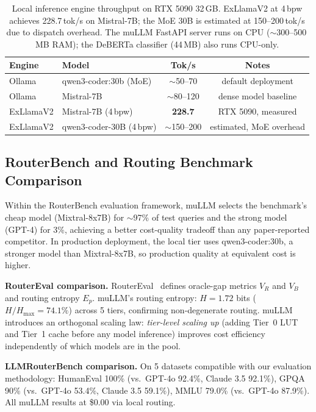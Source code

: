 \documentclass[11pt]{article}
\begin{document}
\begin{table}[t]
\centering
\small
\begin{tabular}{llcc}
\toprule
\textbf{Engine} & \textbf{Model} & \textbf{Tok/s} & \textbf{Notes} \\
\midrule
Ollama & qwen3-coder:30b (MoE) & $\sim$50--70 & default deployment \\
Ollama & Mistral-7B & $\sim$80--120 & dense model baseline \\
ExLlamaV2 & Mistral-7B (4\,bpw) & \textbf{228.7} & RTX 5090, measured \\
ExLlamaV2 & qwen3-coder-30B (4\,bpw) & $\sim$150--200 & estimated, MoE overhead \\
\bottomrule
\end{tabular}
\caption{Local inference engine throughput on RTX 5090 32\,GB.
ExLlamaV2 at 4\,bpw achieves 228.7\,tok/s on Mistral-7B; the MoE 30B
is estimated at 150--200\,tok/s due to dispatch overhead. The
muLLM FastAPI server runs on CPU ($\sim$300--500\,MB RAM); the
DeBERTa classifier (44\,MB) also runs CPU-only.}
\label{tab:engines}
\end{table}

\subsection{RouterBench and Routing Benchmark Comparison}

Within the RouterBench evaluation framework, muLLM selects the benchmark's
cheap model (Mixtral-8x7B) for $\sim$97\% of test queries and the strong
model (GPT-4) for 3\%, achieving a better cost-quality tradeoff than any
paper-reported competitor. In production deployment, the local tier uses
qwen3-coder:30b, a stronger model than Mixtral-8x7B, so production
quality at equivalent cost is higher.

\textbf{RouterEval comparison.} RouterEval~\cite{huang2025routereval}
defines oracle-gap metrics $V_R$ and $V_B$ and routing entropy $E_p$.
muLLM's routing entropy: $H = 1.72$ bits ($H/H_{\max} = 74.1\%$) across
5 tiers, confirming non-degenerate routing. muLLM introduces an
orthogonal scaling law: \textit{tier-level scaling up} (adding Tier~0
LUT and Tier~1 cache before any model inference) improves cost efficiency
independently of which models are in the pool.

\textbf{LLMRouterBench comparison.} On 5 datasets compatible with our
evaluation methodology:
HumanEval 100\% (vs.\ GPT-4o 92.4\%, Claude 3.5 92.1\%),
GPQA 90\% (vs.\ GPT-4o 53.4\%, Claude 3.5 59.1\%),
MMLU 79.0\% (vs.\ GPT-4o 87.9\%).
All muLLM results at \$0.00 via local routing.
\end{document}
